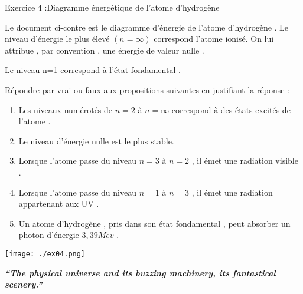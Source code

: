 \documentclass[12pt, french]{article}
\begin{document}



\begin{Box2}{Exercice 4 :Diagramme énergétique de l’atome d’hydrogène }



Le document ci-contre est le diagramme
d’énergie de l’atome d’hydrogène .
Le niveau d’énergie le plus élevé $(n = \infty)$
correspond l’atome ionisé. On lui attribue ,
par convention , une énergie de valeur nulle .

Le niveau n=1 correspond à l’état fondamental .

Répondre par vrai ou faux aux propositions
suivantes en justifiant la réponse :
\begin{enumerate}
	\item  Les niveaux numérotés de $n=2$ à $n = \infty$
correspond à des états excités de l’atome .
\item  Le niveau d’énergie nulle est le plus stable.

\item  Lorsque l’atome passe du niveau $n=3$ à $n=2$ , il émet une radiation visible .

\item  Lorsque l’atome passe du niveau $n=1$ à
$n=3$ , il émet une radiation appartenant aux UV .
\item  Un atome d’hydrogène , pris dans son
état fondamental , peut absorber un photon
d’énergie $3,39Mev$ .
\end{enumerate}
  \begin{center}
	\texttt{[image: ./ex04.png]}
  \end{center}


\end{Box2}


\begin{center} \emph{\textbf{“The physical universe and its buzzing machinery, its fantastical scenery.”}}
\end{center}
\end{document}
